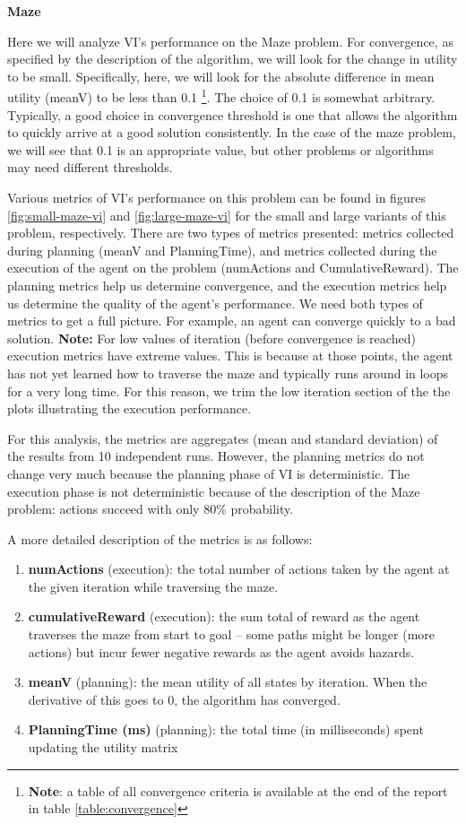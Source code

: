 \documentclass{article}
\begin{document}
\textbf{Maze}

Here we will analyze VI's performance on the Maze problem. For convergence, as specified by the
description of the algorithm, we will look for the change in utility to be small. Specifically,
here, we will look for the absolute difference in mean utility (meanV) to be less than 0.1
\footnote{\textbf{Note}: a table of all convergence criteria is available at the end of the report in table
\ref{table:convergence}}. The
choice of 0.1 is somewhat arbitrary. Typically, a good choice in convergence threshold is one
that allows the algorithm to quickly arrive at a good solution consistently. In the case of the
maze problem, we will see that 0.1 is an appropriate value, but other problems or algorithms
may need different thresholds.

Various metrics of VI's performance on this problem can be found in figures \ref{fig:small-maze-vi}
and \ref{fig:large-maze-vi} for the small and large variants of this problem, respectively. There
are two types of metrics presented: metrics collected during planning (meanV and PlanningTime),
and metrics collected during the execution of the agent on the problem (numActions and
CumulativeReward). The planning metrics help us determine convergence, and the execution metrics help
us determine the quality of the agent's performance. We need both types of metrics to get a full
picture. For example, an agent can converge quickly to a bad solution. \textbf{Note:} For low
values of iteration (before convergence is reached) execution metrics have extreme values. This is
because at those points, the agent has not yet learned how to traverse the maze and typically
runs around in loops for a very long time. For this reason, we trim the low iteration section of the
the plots illustrating the execution performance.

For this analysis, the metrics are aggregates (mean and standard deviation) of the results from
10 independent runs. However, the planning metrics do not change very much because the planning
phase of VI is deterministic. The execution phase is not deterministic because of the description
of the Maze problem: actions succeed with only 80\% probability.

A more detailed description of the metrics is as follows: 

\begin{enumerate}
    \item \textbf{numActions} (execution): the total number of actions taken by the agent at the
    given iteration while traversing the maze.
    \item \textbf{cumulativeReward} (execution): the sum total of reward as the agent traverses the
    maze from start to goal -- some paths might be longer (more actions) but incur fewer negative 
    rewards as the agent avoids hazards.
    \item \textbf{meanV} (planning): the mean utility of all states by iteration. When the derivative
    of this goes to 0, the algorithm has converged.
    \item \textbf{PlanningTime (ms)} (planning): the total time (in milliseconds) spent updating the
    utility matrix
\end{enumerate}
\end{document}
